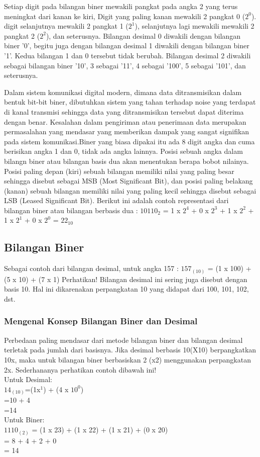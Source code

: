 \documentclass{article}
\begin{document}
Setiap digit pada bilangan biner mewakili pangkat pada angka 2 yang terus meningkat dari kanan ke kiri, Digit yang paling kanan mewakili 2 pangkat 0 ($2^0$). digit selanjutnya mewakili 2 pangkat 1 ($2^1$), selanjutnya lagi mewakili mewakili 2 pangkat 2 ($2^2$), dan seterusnya. Bilangan desimal 0 diwakili dengan bilangan biner '0', begitu juga dengan bilangan desimal 1 diwakili dengan bilangan biner '1'. Kedua bilangan 1 dan 0 tersebut tidak berubah. Bilangan desimal 2 diwakili sebagai bilangan biner '10', 3 sebagai '11', 4 sebagai '100', 5 sebagai '101', dan seterusnya.

Dalam sistem komunikasi digital modern, dimana data ditransmisikan dalam bentuk bit-bit biner, dibutuhkan sistem yang tahan terhadap noise yang terdapat di kanal transmisi sehingga data yang ditransmisikan tersebut dapat diterima dengan benar. Kesalahan dalam pengiriman atau penerimaan data merupakan permasalahan yang mendasar yang memberikan dampak yang sangat signifikan pada sistem komunikasi.Biner yang biasa dipakai itu ada 8 digit angka dan cuma berisikan angka 1 dan 0, tidak ada angka lainnya.
Posisi sebuah angka dalam bilangn biner atau bilangan basis dua akan menentukan berapa bobot nilainya. Posisi paling depan (kiri) sebuah bilangan memiliki nilai yang paling besar sehingga disebut sebagai MSB (Most Significant Bit), dan posisi paling belakang (kanan) sebuah bilangan memiliki nilai yang paling kecil sehingga disebut sebagai LSB (Leased Significant Bit). Berikut ini adalah contoh representasi dari bilangan biner atau bilangan berbasis dua : 
$10110_2$ = 1 x $2^4$ + 0 x $2^3$ + 1 x $2^2$ + 1 x $2^1$ + 0 x $2^0$ = $22_{10}$

\subsection{Bilangan Biner}
Sebagai contoh dari bilangan desimal, untuk angka 157 : $157_{(10)}$ = (1 x 100) + (5 x 10) + (7 x 1) 
Perhatikan! Bilangan desimal ini sering juga disebut dengan basis 10. Hal ini dikarenakan perpangkatan 10 yang didapat dari 100, 101, 102, dst. 
\subsubsection{Mengenal Konsep Bilangan Biner dan Desimal}
Perbedaan paling mendasar dari metode bilangan biner dan bilangan desimal terletak pada jumlah dari basisnya. Jika desimal berbasis 10(X10) berpangkatkan 10x, maka untuk bilangan biner berbasiskan 2 (x2) menggunakan perpangkatan 2x. Sederhananya perhatikan contoh dibawah ini!\\
Untuk Desimal:\\
$14_{(10)}$=(1x$^1$) + (4 x $10^0$)\\
=10 + 4\\
=14\\
Untuk Biner: \\
$1110_{(2)}$ = (1 x 23) + (1 x 22) + (1 x 21) + (0 x 20)\\
 = 8 + 4 + 2 + 0\\
 = 14\\
\end{document}
